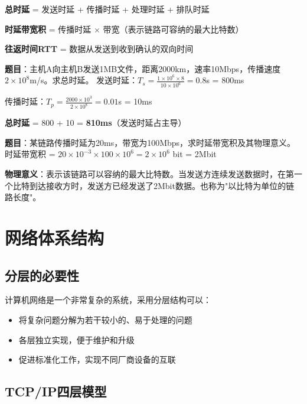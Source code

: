 \documentclass[12pt,a4paper,openany]{ctexbook}
\begin{document}
\begin{formulabox}
\textbf{总时延} = 发送时延 + 传播时延 + 处理时延 + 排队时延

\textbf{时延带宽积} = 传播时延 $\times$ 带宽（表示链路可容纳的最大比特数）

\textbf{往返时间RTT} = 数据从发送到收到确认的双向时间
\end{formulabox}

\begin{examplebox}[例题1.2 时延计算]
\textbf{题目}：主机A向主机B发送1MB文件，距离2000km，速率10Mbps，传播速度$2\times10^8$m/s。求总时延。
\tcblower
发送时延：$T_s = \frac{1\times10^6\times8}{10\times10^6} = 0.8$s = 800ms

传播时延：$T_p = \frac{2000\times10^3}{2\times10^8} = 0.01$s = 10ms

\textbf{总时延} = 800 + 10 = \textbf{810ms}（发送时延占主导）
\end{examplebox}

\begin{examplebox}[例题1.3 时延带宽积]
\textbf{题目}：某链路传播时延为20ms，带宽为100Mbps，求时延带宽积及其物理意义。
\tcblower
时延带宽积 = $20 \times 10^{-3} \times 100 \times 10^6 = 2 \times 10^6$ bit = 2Mbit

\textbf{物理意义}：表示该链路可以容纳的最大比特数。当发送方连续发送数据时，在第一个比特到达接收方时，发送方已经发送了2Mbit数据。也称为"以比特为单位的链路长度"。
\end{examplebox}

\section{网络体系结构}
\subsection{分层的必要性}
计算机网络是一个非常复杂的系统，采用分层结构可以：
\begin{itemize}[leftmargin=2em,itemsep=0pt]
    \item 将复杂问题分解为若干较小的、易于处理的问题
    \item 各层独立实现，便于维护和升级
    \item 促进标准化工作，实现不同厂商设备的互联
\end{itemize}

\subsection{TCP/IP四层模型}
\begin{center}
\end{center}
\end{document}
